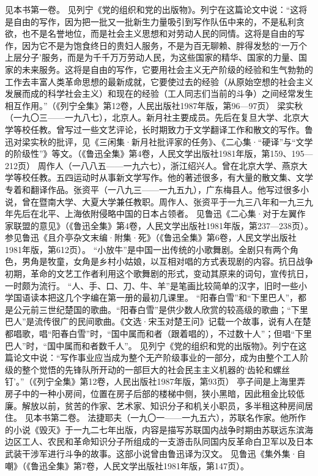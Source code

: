 \begin{maonote}
见本书第一卷。
见列宁《党的组织和党的出版物》。列宁在这篇论文中说：“这将是自由的写作，因为把一批又一批新生力量吸引到写作队伍中来的，不是私利贪欲，也不是名誉地位，而是社会主义思想和对劳动人民的同情。这将是自由的写作，因为它不是为饱食终日的贵妇人服务，不是为百无聊赖、胖得发愁的‘一万个上层分子’服务，而是为千千万万劳动人民，为这些国家的精华、国家的力量、国家的未来服务。这将是自由的写作，它要用社会主义无产阶级的经验和生气勃勃的工作去丰富人类革命思想的最新成就，它要使过去的经验（从原始空想的社会主义发展而成的科学社会主义）和现在的经验（工人同志们当前的斗争）之间经常发生相互作用。”（《列宁全集》第12卷，人民出版社1987年版，第96—97页）
梁实秋（一九〇三——一九八七），北京人。新月社主要成员。先后在复旦大学、北京大学等校任教。曾写过一些文艺评论，长时期致力于文学翻译工作和散文的写作。鲁迅对梁实秋的批评，见《三闲集·新月社批评家的任务》、《二心集·“硬译”与“文学的阶级性”》等文。（《鲁迅全集》第4卷，人民文学出版社1981年版，第159、195—212页）
周作人（一八八五——一九六七），浙江绍兴人。曾在北京大学、燕京大学等校任教。五四运动时从事新文学写作。他的著述很多，有大量的散文集、文学专着和翻译作品。张资平（一八九三——一九五九），广东梅县人。他写过很多小说，曾在暨南大学、大夏大学兼任教职。周作人、张资平于一九三八年和一九三九年先后在北平、上海依附侵略中国的日本占领者。
见鲁迅《二心集·对于左翼作家联盟的意见》（《鲁迅全集》第4卷，人民文学出版社1981年版，第237—238页）。
参见鲁迅《且介亭杂文末编·附集·死》（《鲁迅全集》第6卷，人民文学出版社1981年版，第612页）。
“小放牛”是中国一出传统的小歌舞剧。全剧只有两个角色，男角是牧童，女角是乡村小姑娘，以互相对唱的方式表现剧的内容。抗日战争初期，革命的文艺工作者利用这个歌舞剧的形式，变动其原来的词句，宣传抗日，一时颇为流行。
“人、手、口、刀、牛、羊”是笔画比较简单的汉字，旧时一些小学国语读本把这几个字编在第一册的最初几课里。
“阳春白雪”和“下里巴人”，都是公元前三世纪楚国的歌曲。“阳春白雪”是供少数人欣赏的较高级的歌曲；“下里巴人”是流传很广的民间歌曲。《文选·宋玉对楚王问》记载一个故事，说有人在楚都唱歌，唱“阳春白雪”时，“国中属而和者（跟着唱的），不过数十人”；但唱“下里巴人”时，“国中属而和者数千人”。
见列宁《党的组织和党的出版物》。列宁在这篇论文中说：“写作事业应当成为整个无产阶级事业的一部分，成为由整个工人阶级的整个觉悟的先锋队所开动的一部巨大的社会民主主义机器的‘齿轮和螺丝钉’。”（《列宁全集》第12卷，人民出版社1987年版，第93页）
亭子间是上海里弄房子中的一种小房间，位置在房子后部的楼梯中侧，狭小黑暗，因此租金比较低廉。解放以前，贫苦的作家、艺术家、知识分子和机关小职员，多半租这种房间居住。
见本书第二卷。
法捷耶夫（一九〇一——一九五六），苏联名作家。他所作的小说《毁灭》于一九二七年出版，内容是描写苏联国内战争时期由苏联远东滨海边区工人、农民和革命知识分子所组成的一支游击队同国内反革命白卫军以及日本武装干涉军进行斗争的故事。这部小说曾由鲁迅译为汉文。
见鲁迅《集外集·自嘲》（《鲁迅全集》第7卷，人民文学出版社1981年版，第147页）。
\end{maonote}
